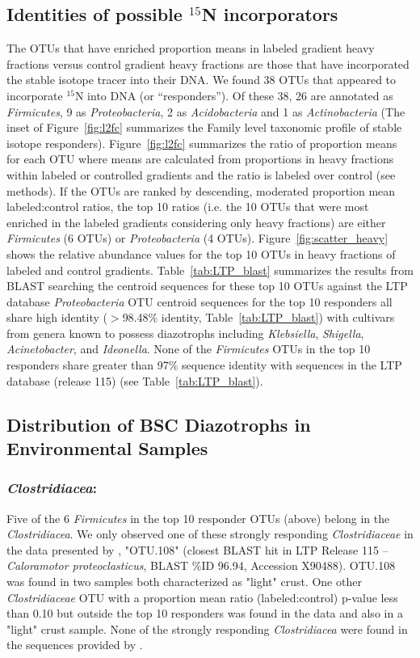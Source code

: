 \subsection{Identities of possible $^{15}$N incorporators} The OTUs that have
enriched proportion means in labeled gradient heavy fractions versus control
gradient heavy fractions are those that have incorporated the stable isotope
tracer into their DNA. We found 38 OTUs that appeared to incorporate $^{15}$N
into DNA (or ``responders''). Of these 38, 26 are annotated as
\textit{Firmicutes}, 9 as \textit{Proteobacteria}, 2 as
\textit{Acidobacteria} and 1 as \textit{Actinobacteria} (The inset of
Figure~\ref{fig:l2fc} summarizes the Family level taxonomic profile of stable
isotope responders).  Figure~\ref{fig:l2fc} summarizes the ratio of
proportion means for each OTU where means are calculated from proportions in
heavy fractions within labeled or controlled gradients and the ratio is
labeled over control (see methods). If the OTUs are ranked by descending,
moderated proportion mean labeled:control ratios, the top 10 ratios (i.e. the
10 OTUs that were most enriched in the labeled gradients considering only
heavy fractions) are either \textit{Firmicutes} (6 OTUs) or
\textit{Proteobacteria} (4 OTUs).  Figure~\ref{fig:scatter_heavy} shows the
relative abundance values for the top 10 OTUs in heavy fractions of labeled
and control gradients.  Table~\ref{tab:LTP_blast} summarizes the results from
BLAST searching the centroid sequences for these top 10 OTUs against the LTP
database \textit{Proteobacteria} OTU centroid sequences for the top 10
responders all share high identity ($>$98.48\% identity,
Table~\ref{tab:LTP_blast}) with cultivars from genera known to possess
diazotrophs including \textit{Klebsiella}, \textit{Shigella},
\textit{Acinetobacter}, and \textit{Ideonella}. None of the
\textit{Firmicutes} OTUs in the top 10 responders share greater than 97\%
sequence identity with sequences in the LTP database (release 115) (see
Table~\ref{tab:LTP_blast}).

\subsection{Distribution of BSC Diazotrophs in Environmental Samples}
\subsubsection{\textbf{\textit{Clostridiacea}:}} Five of the 6
\textit{Firmicutes} in the top 10 responder OTUs (above) belong in the
\textit{Clostridiacea}. We only observed one of these strongly responding
\textit{Clostridiaceae} in the data presented by \citet{Garcia_Pichel_2013},
"OTU.108" (closest BLAST hit in LTP Release 115 -- \textit{Caloramotor
proteoclasticus}, BLAST \%ID 96.94, Accession X90488).  OTU.108 was found in
two samples both characterized as "light" crust. One other
\textit{Clostridiaceae} OTU with a proportion mean ratio (labeled:control)
p-value less than 0.10 but outside the top 10 responders was found in the
\citet{Garcia_Pichel_2013} data and also in a "light" crust sample. None of
the strongly responding \textit{Clostridiacea} were found in the sequences
provided by \citet{Steven_2013}.

